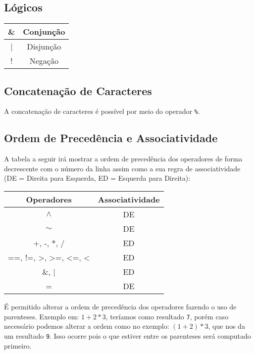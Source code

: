 \documentclass[a4paper,11pt]{article}
\begin{document}
\subsection{Lógicos}
\begin{center}
    \begin{tabular}{|c|c|}
         \hline
         \& & Conjunção\\
         \hline
         | & Disjunção\\
         \hline
         ! & Negação\\
         \hline
    \end{tabular}
\end{center}

\subsection{Concatenação de Caracteres}
A concatenação de caracteres é possível por meio do operador \texttt{\%}.

\subsection{Ordem de Precedência e Associatividade}
A tabela a seguir irá mostrar a ordem de precedência dos operadores de forma decrescente com o
número da linha assim como a sua regra de associatividade (DE = Direita para Esquerda, ED = 
Esquerda para Direita):
\begin{center}
    \begin{tabular}{|c|c|}
         \hline
         \textbf{Operadores} & \textbf{Associatividade}\\
         \hline
         $\wedge$ & DE\\
         \hline
         $\sim$ & DE\\
         \hline
         +, -, $\ast$, / & ED\\
         \hline
         ==, !=, >, >=, <=, < & ED\\
         \hline
         \&, | & ED\\
         \hline
         = & DE\\
         \hline
    \end{tabular}
\end{center}

\hfill

É permitido alterar a ordem de precedência dos operadores fazendo o uso de parenteses.
Exemplo em: $1 + 2 * 3$, teríamos como resultado \texttt{7}, porém caso necessário podemos
alterar a ordem como no exemplo: $(1 + 2) * 3$, que nos da um resultado \texttt{9}. Isso ocorre
pois o que estiver entre os parenteses será computado primeiro.
\end{document}
